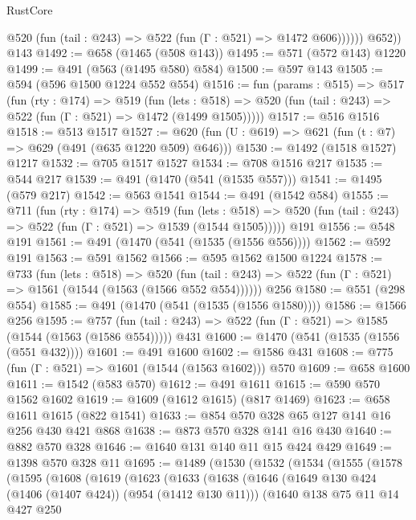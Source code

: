 \begin{lexlean}{RustCore}
\begin{coremodule}
              @520 (fun (tail : @243) => @522 (fun (Γ : @521) => @1472 @606))))))
        @652))
    @143
@1492 := @658 (@1465 (@508 @143))
@1495 := @571 (@572 @143) @1220
@1499 := @491 (@563 (@1495 @580) @584)
@1500 := @597 @143
@1505 := @594 (@596 @1500 @1224 @552 @554)
@1516 := fun (params : @515) =>
  @517
    (fun (rty : @174) =>
    @519
      (fun (lets : @518) =>
      @520 (fun (tail : @243) => @522 (fun (Γ : @521) => @1472 (@1499 @1505)))))
@1517 := @516 @1516
@1518 := @513 @1517
@1527 := @620 (fun (U : @619) => @621 (fun (t : @7) => @629 (@491 (@635 @1220 @509) @646)))
@1530 := @1492 (@1518 @1527) @1217
@1532 := @705 @1517 @1527
@1534 := @708 @1516 @217
@1535 := @544 @217
@1539 := @491 (@1470 (@541 (@1535 @557)))
@1541 := @1495 (@579 @217)
@1542 := @563 @1541
@1544 := @491 (@1542 @584)
@1555 := @711
    (fun (rty : @174) =>
    @519
      (fun (lets : @518) =>
      @520 (fun (tail : @243) => @522 (fun (Γ : @521) => @1539 (@1544 @1505)))))
    @191
@1556 := @548 @191
@1561 := @491 (@1470 (@541 (@1535 (@1556 @556))))
@1562 := @592 @191
@1563 := @591 @1562
@1566 := @595 @1562 @1500 @1224
@1578 := @733
    (fun (lets : @518) =>
    @520 (fun (tail : @243) => @522 (fun (Γ : @521) => @1561 (@1544 (@1563 (@1566 @552 @554))))))
    @256
@1580 := @551 (@298 @554)
@1585 := @491 (@1470 (@541 (@1535 (@1556 @1580))))
@1586 := @1566 @256
@1595 := @757
    (fun (tail : @243) => @522 (fun (Γ : @521) => @1585 (@1544 (@1563 (@1586 @554)))))
    @431
@1600 := @1470 (@541 (@1535 (@1556 (@551 @432))))
@1601 := @491 @1600
@1602 := @1586 @431
@1608 := @775 (fun (Γ : @521) => @1601 (@1544 (@1563 @1602))) @570
@1609 := @658 @1600
@1611 := @1542 (@583 @570)
@1612 := @491 @1611
@1615 := @590 @570 @1562 @1602
@1619 := @1609 (@1612 @1615) (@817 @1469)
@1623 := @658 @1611 @1615 (@822 @1541)
@1633 := @854 @570 @328 @65 @127 @141 @16 @256 @430 @421 @868
@1638 := @873 @570 @328 @141 @16 @430
@1640 := @882 @570 @328
@1646 := @1640 @131 @140 @11 @15 @424 @429
@1649 := @1398 @570 @328 @11
@1695 := @1489
    (@1530
      (@1532
        (@1534
          (@1555
            (@1578
              (@1595
                (@1608
                  (@1619
                    (@1623
                      (@1633
                        (@1638
                          (@1646
                            (@1649 @130 @424 (@1406 (@1407 @424)) (@954 (@1412 @130 @11)))
                            (@1640
                              @138
                              @75
                              @11
                              @14
                              @427
                              @250

\end{coremodule}
\end{lexlean}

